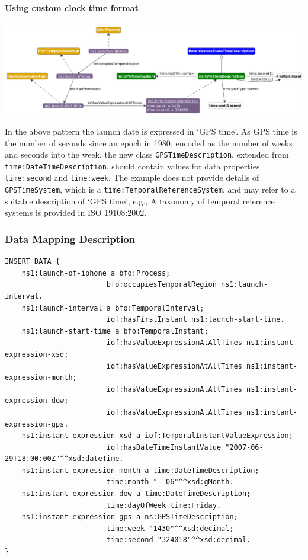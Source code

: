 \paragraph{Using custom clock time format \\}

\includegraphics[scale=0.35]{scenarios/clock-time-calendar-date/images/uc1-custom.png}

In the above pattern the launch date is expressed in `GPS time'. As GPS time is the number of seconds since an epoch in 1980, encoded as the number of weeks and seconds into the week, the new class  \texttt{GPSTimeDescription}, extended from \texttt{time:DateTimeDescription}, should contain values for data properties \texttt{time:second} and \texttt{time:week}. The example does not provide details of \texttt{GPSTimeSystem}, which is a \texttt{time:TemporalReferenceSystem}, and may refer to a suitable description of `GPS time', e.g., A taxonomy of temporal reference systems is provided in ISO 19108:2002. 


\subsubsection*{Data Mapping Description}

\begin{verbatim}
INSERT DATA {
    ns1:launch-of-iphone a bfo:Process;
                        bfo:occupiesTemporalRegion ns1:launch-interval.
    ns1:launch-interval a bfo:TemporalInterval;
                        iof:hasFirstInstant ns1:launch-start-time.
    ns1:launch-start-time a bfo:TemporalInstant;
                        iof:hasValueExpressionAtAllTimes ns1:instant-expression-xsd;
                        iof:hasValueExpressionAtAllTimes ns1:instant-expression-month;
                        iof:hasValueExpressionAtAllTimes ns1:instant-expression-dow;
                        iof:hasValueExpressionAtAllTimes ns1:instant-expression-gps.
    ns1:instant-expression-xsd a iof:TemporalInstantValueExpression;
                        iof:hasDateTimeInstantValue "2007-06-29T18:00:00Z"^^xsd:dateTime.
    ns1:instant-expression-month a time:DateTimeDescription;
                        time:month "--06"^^xsd:gMonth.
    ns1:instant-expression-dow a time:DateTimeDescription;
                        time:dayOfWeek time:Friday.
    ns1:instant-expression-gps a ns:GPSTimeDescription;
                        time:week "1430"^^xsd:decimal;
                        time:second "324018"^^xsd:decimal. 
}
\end{verbatim}

